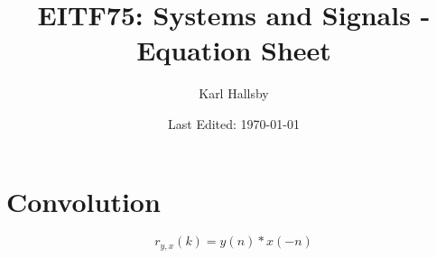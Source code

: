 


% 


\DeclareMathOperator{\TimeDelay}{\mathrm{TD}_{k}}
\DeclareMathOperator{\FoldTime}{\mathrm{FD}}
\DeclareMathOperator{\SignalOperator}{\mathcal{T}}
\DeclareMathOperator{\ZTransformRelation}{\overset{z}{\longleftrightarrow}}
\DeclareMathOperator{\ZTransform}{\mathcal{Z}}
\DeclareMathOperator{\UnitImpulse}{\delta}
\DeclareMathOperator{\ROC}{\mathrm{ROC}}
\DeclareMathOperator{\FourierTransform}{F}
\DeclareMathOperator{\FourierTransformRelation}{\overset{F}{\longleftrightarrow}}
\DeclareMathOperator{\CircularConvolution}{\circledast}
\DeclareMathOperator{\DFTRelation}{\overset{\text{DFT}}{\underset{N}{\longleftrightarrow}}}

\begin{titlepage}
  \title{EITF75: Systems and Signals - Equation Sheet}
  \author{Karl Hallsby}
  \date{Last Edited: \today} %
\end{titlepage}


\section{Convolution}
\begin{equation}\label{eq:Cross_Correlation-Convolution}
  r_{y,x}(k) = y(n) * x(-n)
\end{equation}

